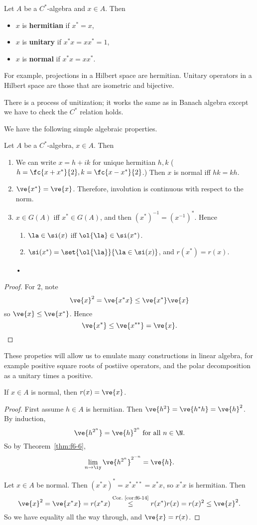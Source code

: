 \begin{df}
Let $A$ be a $C^*$-algebra and $x\in A$. Then
\begin{itemize}
\item
$x$ is \textbf{hermitian} if $x^*=x$,
\item
$x$ is \textbf{unitary} if $x^*x=xx^*=1$,
\item
$x$ is \textbf{normal} if $x^*x=xx^*$.
\end{itemize}
\end{df}
For example, projections in a Hilbert space are hermitian. Unitary operators in a Hilbert space are those that are isometric and bijective.


There is a process of unitization; it works the same as in Banach algebra except we have to check the $C^*$ relation holds. 

We have the following simple algebraic properties.
\begin{pr}
Let $A$ be a $C^*$-algebra, $x\in A$. Then
\begin{enumerate}
\item
We can write $x=h+ik$ for unique hermitian $h,k$ ($h=\fc{x+x^*}{2}, k=\fc{x-x^*}{2}$.)
Then $x$ is normal iff $hk=kh$.
\item
$\ve{x^*}=\ve{x}$. Therefore, involution is continuous with respect to the norm.
\item
$x\in G(A)$ iff $x^*\in G(A)$, and then $(x^*)^{-1}=(x^{-1})^*$. Hence
\begin{enumerate}
\item
 $\la\in \si(x)$ iff $\ol{\la}\in \si(x^*)$.
\item
$\si(x^*)=\set{\ol{\la}}{\la \in \si(x)}$, and
$r(x^*)=r(x)$.
\end{enumerate}•
\end{enumerate}
\end{pr}
\begin{proof}
For 2, note 
\[
\ve{x}^2=\ve{x^*x}\le \ve{x^*}\ve{x}
\]
so $\ve{x}\le \ve{x^*}$. Hence
\[
\ve{x^*}\le \ve{x^{**}}=\ve{x}.
\]
\end{proof}
These propeties will allow us to emulate many constructions in linear algebra, for example positive square roots of postiive operators, and the polar decomposition as a unitary times a positive.

\begin{lem}
If $x\in A$ is normal, then $r(x)=\ve{x}$. 
\end{lem}
\begin{proof}%
First assume $h\in A$ is hermitian. Then $\ve{h^2}=\ve{h^*h}=\ve{h}^2$. By induction, 
\[
\ve{h^{2^n}}=\ve{h}^{2^n}\text{ for all }n\in \N.
\]
So by Theorem~\ref{thm:f6-6},
\[
\lim_{n\to \iy}\ve{h^{2^n}}^{2^{-n}}=\ve{h}.
\]

Let $x\in A$ be normal. Then $(x^*x)^*=x^*x^{**}=x^*x$, so $x^*x$ is hermitian. Then
\[
\ve{x}^2=\ve{x^*x}=r(x^*x)\stackrel{\text{Cor.~\ref{cor:f6-14}}}{\le} r(x^*)r(x)=r(x)^2\le \ve{x}^2.
\]
So we have equality all the way through, and $\ve{x}=r(x)$.
\end{proof}

